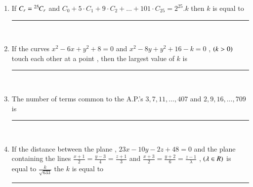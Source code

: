 \documentclass[journal,12pt,onecolumn]{IEEEtran}
\theoremstyle{remark}
\begin{document}
\begin{enumerate}
   \item If $C_r = {{}^{25}\mkern-1muC_{r}}$ and $C_0+ 5 \cdot C_1+ 9 \cdot C_2+ \dots + 101 \cdot C_{25} = 2^{25}. k $ then $k$ is equal to \rule{1cm}{0.15mm}\\


   \item If the curves $x^2-6x+y^2+8=0$ and $x^2-8y+y^2+16-k=0$ , $\left(k>0\right)$ touch each other at a point , then the largest value of $k$ is \rule{1cm}{0.15mm}\\

   \item The number of terms common to the A.P.'s $3,7,11,\dots , 407$ and $2,9,16,\dots , 709$ is \rule{1cm}{0.15mm}\\


   \item If the distance between the plane , $23x-10y-2z+48=0$ and the plane containing the lines $\frac{x+1}{2} = \frac{y-3}{4} = \frac{z+1}{3}$ and $\frac{x+3}{2} = \frac{y+2}{6} = \frac{z-1}{\lambda}$ , $\left(\lambda \in R\right)$ is equal to $\frac{k}{\sqrt{633}}$ the $k$ is equal to \rule{1cm}{0.15mm}\\
\end{enumerate}
\end{document}
